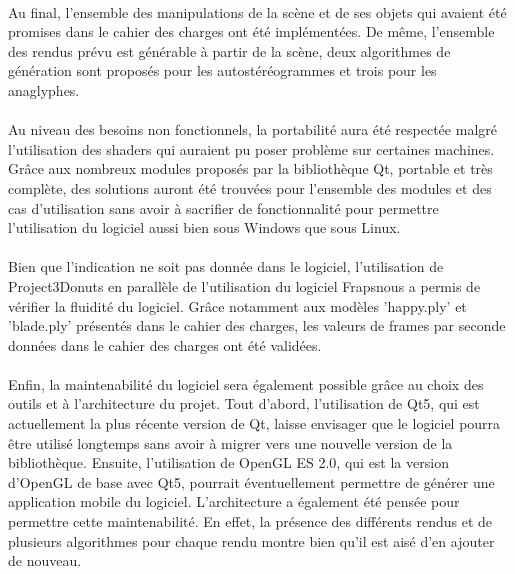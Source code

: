 \paragraph{}
Au final, l'ensemble des manipulations de la scène et de ses objets qui avaient été promises dans le cahier des charges ont été implémentées. De même, l'ensemble des rendus prévu est générable à partir de la scène, deux algorithmes de génération sont proposés pour les autostéréogrammes et trois pour les anaglyphes.

\paragraph{}
Au niveau des besoins non fonctionnels, la portabilité aura été respectée malgré l'utilisation des shaders qui auraient pu poser problème sur certaines machines. Grâce aux nombreux modules proposés par la bibliothèque Qt, portable et très complète, des solutions auront été trouvées pour l'ensemble des modules et des cas d'utilisation sans avoir à sacrifier de fonctionnalité pour permettre l'utilisation du logiciel aussi bien sous Windows que sous Linux.

\paragraph{}
Bien que l'indication ne soit pas donnée dans le logiciel, l'utilisation de Project3Donuts en parallèle de l'utilisation du logiciel Fraps\footnotemark nous a permis de vérifier la fluidité du logiciel. Grâce notamment aux modèles 'happy.ply' et 'blade.ply' présentés dans le cahier des charges, les valeurs de frames par seconde données dans le cahier des charges ont été validées.
\paragraph{}
Enfin, la maintenabilité du logiciel sera également possible grâce au choix des outils et à l'architecture du projet. 
Tout d'abord, l'utilisation de Qt5, qui est actuellement la plus récente version de Qt, laisse envisager que le logiciel pourra être utilisé longtemps sans avoir à migrer vers une nouvelle version de la bibliothèque. Ensuite, l'utilisation de OpenGL ES 2.0, qui est la version d'OpenGL de base avec Qt5, pourrait éventuellement permettre de générer une application mobile du logiciel. 
L'architecture a également été pensée pour permettre cette maintenabilité. En effet, la présence des différents rendus et de plusieurs algorithmes pour chaque rendu montre bien qu'il est aisé d'en ajouter de nouveau.

